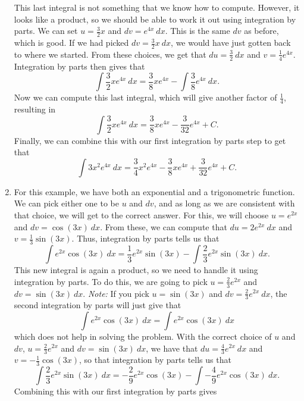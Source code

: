 \documentclass{ximera}
\begin{document}
\begin{exampleSol}
\begin{enumerate}
            This last integral is not something that we know how to compute. However, it looks like a product, so we should be able to work it out using integration by parts. We can set $u = \frac{3}{2}x$ and $dv = e^{4x}\ dx$. This is the same $dv$ as before, which is good. If we had picked $dv = \frac{3}{2}x\ dx$, we would have just gotten back to where we started. From these choices, we get that $du = \frac{3}{2}\ dx$ and $v = \frac{1}{4} e^{4x}$. Integration by parts then gives that
            \[ 
                \int \frac{3}{2} xe^{4x}\ dx = \frac{3}{8}xe^{4x} - \int \frac{3}{8}e^{4x}\ dx. 
            \] 
            Now we can compute this last integral, which will give another factor of $\frac{1}{4}$, resulting in 
            \[ 
                \int \frac{3}{2} xe^{4x}\ dx = \frac{3}{8}xe^{4x} - \frac{3}{32}e^{4x} + C. 
            \] 
            Finally, we can combine this with our first integration by parts step to get that
            \[ 
                \int 3x^2e^{4x}\ dx =  \frac{3}{4}x^2e^{4x}- \frac{3}{8}xe^{4x} + \frac{3}{32}e^{4x} + C. 
            \]
        \item For this example, we have both an exponential and a trigonometric function. We can pick either one to be $u$ and $dv$, and as long as we are consistent with that choice, we will get to the correct answer. For this, we will choose $u = e^{2x}$ and $dv = \cos(3x)\ dx$. From these, we can compute that $du = 2e^{2x}\ dx$ and $v = \frac{1}{3}\sin(3x)$. Thus, integration by parts tells us that
            \[ 
                \int e^{2x}\cos(3x)\ dx = \frac{1}{3}e^{2x}\sin(3x) - \int \frac{2}{3}e^{2x}\sin(3x)\ dx.
            \] 
            This new integral is again a product, so we need to handle it using integration by parts. To do this, we are going to pick $u = \frac{2}{3}e^{2x}$ and $dv = \sin(3x)\ dx$. \emph{Note:} If you pick $u = \sin(3x)$ and $dv = \frac{2}{3}e^{2x}\ dx$, the second integration by parts will just give that 
            \[ 
                \int e^{2x}\cos(3x) \ dx = \int e^{2x}\cos(3x)\ dx 
            \] 
            which does not help in solving the problem. With the correct choice of $u$ and $dv$, $u = \frac{2}{3}e^{2x}$ and $dv = \sin(3x)\ dx$, we have that $du = \frac{4}{3}e^{2x}\ dx$ and $v = -\frac{1}{3}\cos(3x)$, so that integration by parts tells us that
            \[ 
                \int \frac{2}{3}e^{2x}\sin(3x)\ dx = -\frac{2}{9}e^{2x}\cos(3x) - \int - \frac{4}{9}e^{2x}\cos(3x)\ dx.
            \] 
            Combining this with our first integration by parts gives
            \[ 
                \begin{split}

\end{split}\]
\end{enumerate}
\end{exampleSol}
\end{document}
